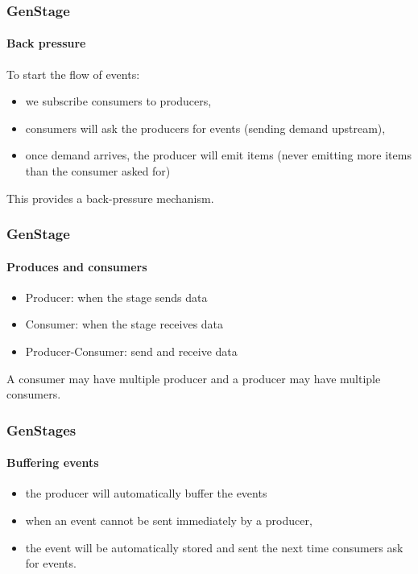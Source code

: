 \documentclass{beamer}
\begin{document}
  \begin{frame}
    \frametitle{GenStage}
    \framesubtitle{Back pressure}
    
    \begin{block}{}
    To start the flow of events:
    \begin{itemize}[<+->]
      \item we subscribe consumers to producers,
      \item consumers will ask the producers for events (sending demand upstream),
      \item once demand arrives, the producer will emit items (never emitting more items than the consumer asked for)
    \end{itemize}
     
    \end{block}

    \pause
    
    \begin{alertblock}{} 
    This provides a back-pressure mechanism.
    \end{alertblock} 

  \end{frame}

  \begin{frame}
    \frametitle{GenStage}
    \framesubtitle{Produces and consumers}
        
    \begin{itemize}[<+->]
      \item  Producer: when the stage sends data
      \item  Consumer: when the stage receives data
      \item  Producer-Consumer: send and receive data
    \end{itemize}
    
    \pause
    
    A consumer may have multiple producer and a producer may have multiple consumers.
        
  \end{frame}
  
  \begin{frame}
    \frametitle{GenStages}
    \framesubtitle{Buffering events}
    
    \begin{itemize}[<+->]
      \item the producer will automatically buffer the events
      \item when an event cannot be sent immediately by a producer,
      \item the event will be automatically stored and sent the next time consumers ask for events.
    \end{itemize}
    
    
  \end{frame}
\end{document}
